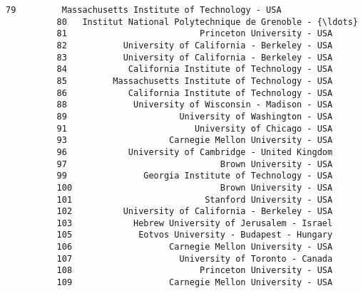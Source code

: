 \documentclass[11pt]{article}
\begin{document}
\begin{Verbatim}[commandchars=\\\{\}]
          79         Massachusetts Institute of Technology - USA   
          80   Institut National Polytechnique de Grenoble - {\ldots}   
          81                          Princeton University - USA   
          82           University of California - Berkeley - USA   
          83           University of California - Berkeley - USA   
          84            California Institute of Technology - USA   
          85         Massachusetts Institute of Technology - USA   
          86            California Institute of Technology - USA   
          88             University of Wisconsin - Madison - USA   
          89                      University of Washington - USA   
          91                         University of Chicago - USA   
          93                    Carnegie Mellon University - USA   
          96            University of Cambridge - United Kingdom   
          97                              Brown University - USA   
          99               Georgia Institute of Technology - USA   
          100                             Brown University - USA   
          101                          Stanford University - USA   
          102          University of California - Berkeley - USA   
          103            Hebrew University of Jerusalem - Israel   
          105             Eotvos University - Budapest - Hungary   
          106                   Carnegie Mellon University - USA   
          107                     University of Toronto - Canada   
          108                         Princeton University - USA   
          109                   Carnegie Mellon University - USA   
          

\end{Verbatim}
\end{document}
